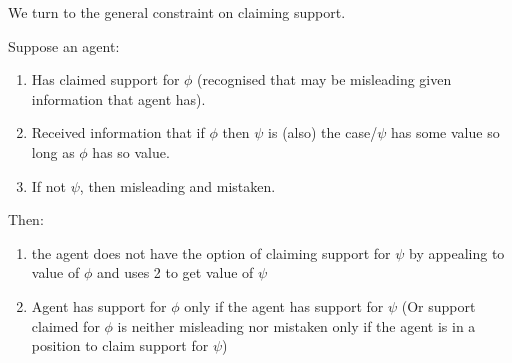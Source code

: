 \begin{note}[\nI{-}]
  We turn to the general constraint on claiming support.
  \begin{proposition}[\nI{-}  --- \nI{}]\label{prem:ni}
    Suppose an agent:
    \begin{enumerate}[label=(\textsf{SINIS}\arabic*), ref=(\textsf{SINIS}\arabic*)]
    \item\label{nI:claimed-support} Has claimed support for \(\phi\) (recognised that may be misleading given information that agent has).
    \item\label{nI:received-info} Received information that if \(\phi\) then \(\psi\) is (also) the case/\(\psi\) has some value so long as \(\phi\) has so value.
    \item\label{nI:not-then-MandM} If not \(\psi\), then misleading and mistaken.
    \end{enumerate}
    Then:
    \begin{enumerate}[label=(\textsf{SINIS}\arabic*), ref=(\textsf{SINIS}\arabic*), resume]
    \item\label{nI:going-by-value} the agent does not have the option of claiming support for \(\psi\) by appealing to value of \(\phi\) and uses 2 to get value of \(\psi\)
    \item {\color{red} Agent has support for \(\phi\) only if the agent has support for \(\psi\)} (Or support claimed for \(\phi\) is neither misleading nor mistaken only if the agent is in a position to claim support for \(\psi\))
    \end{enumerate}
  \end{proposition}


\end{note}
